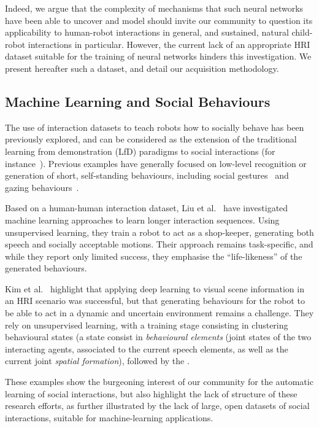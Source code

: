 \documentclass{article}
\newcommand{\etal}{et al.\xspace}
\begin{document}
Indeed, we argue that the complexity of mechanisms that such neural networks
have been able to uncover and model should invite our community to question its
applicability to human-robot interactions in general, and sustained, natural
child-robot interactions in particular.  However, the current lack of an
appropriate HRI dataset suitable for the training of neural networks hinders
this investigation. We present hereafter such a dataset, and detail our
acquisition methodology.

\subsection*{Machine Learning and Social Behaviours}

The use of interaction datasets to teach robots how to socially behave has been
previously explored, and can be considered as the extension of the traditional
learning from demonstration (LfD) paradigms to social interactions (for
instance~\cite{nehaniv2007imitation,mohammad2015interaction}). Previous examples
have generally focused on low-level recognition or generation of short,
self-standing behaviours, including social gestures~\cite{nagai2005learning} and
gazing behaviours~\cite{calinon2006teaching}.

Based on a human-human interaction dataset, Liu \etal~\cite{liu2014how} have
investigated machine learning approaches to learn longer interaction sequences.
Using unsupervised learning, they train a robot to act as a shop-keeper,
generating both speech and socially acceptable motions. Their approach remains
task-specific, and while they report only limited success, they emphasise the
``life-likeness'' of the generated behaviours.

Kim \etal~\cite{kim2015pororobot} highlight that applying deep learning to
visual scene information in an HRI scenario was successful, but that
generating behaviours for the robot to be able to act in a dynamic and uncertain
environment remains a challenge.
They rely on unsupervised learning, with a
training stage consisting in clustering behavioural states (a state consist in
\emph{behavioural elements} (joint states of the two interacting agents,
associated to the current speech elements, as well as the current joint
\emph{spatial formation}), followed by the .

These examples show the burgeoning interest of our community for the automatic
learning of social interactions, but also highlight the lack of structure of
these research efforts, as further illustrated by the lack of large, open
datasets of social interactions, suitable for machine-learning applications.
\end{document}
